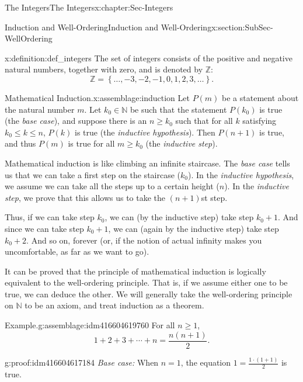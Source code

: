 \documentclass[oneside,10pt,]{book}
\numberwithin{equation}{section}
\renewcommand{\le}{\leqslant}
\renewcommand{\ge}{\geqslant}
\newcommand{\set}[1]{\left\{ {#1} \right\}}
\def\Z{{\mathbb Z}}
\def\N{{\mathbb N}}
\begin{document}
\begin{chapterptx}{The Integers}{}{The Integers}{}{}{x:chapter:Sec-Integers}
\begin{sectionptx}{Induction and Well-Ordering}{}{Induction and Well-Ordering}{}{}{x:section:SubSec-WellOrdering}
\begin{definition}{}{x:definition:def_integers}
 \index{\(\Z\)} The set of integers consists of the positive and negative natural numbers, together with zero, and is denoted by \(\Z\):%
\begin{equation*}
\Z = \set{\ldots, -3, -2, -1, 0, 1, 2, 3, \ldots}\text{.}
\end{equation*}
%
\end{definition}
\begin{assemblage}{Mathematical Induction.}{x:assemblage:induction}%
Let \(P(m)\) be a statement about the natural number \(m\)\footnotemark{}. Let \(k_0\in \N\) be such that the statement \(P(k_0)\) is true (the \emph{base case}), and suppose there is an \(n\ge k_0\) such that for all \(k\) satisfying \(k_0 \le k \le n\), \(P(k)\) is true (the \emph{inductive hypothesis}). Then \(P(n+1)\) is true, and thus \(P(m)\) is true for all \(m\ge k_0\) (the \emph{inductive step}).%
\end{assemblage}
%
Mathematical induction is like climbing an infinite staircase. The \emph{base case} tells us that we can take a first step on the staircase (\(k_0\)). In the \emph{inductive hypothesis}, we assume we can take all the steps up to a certain height (\(n\)). In the \emph{inductive step}, we prove that this allows us to take the \((n+1)\)st step.%
\par
Thus, if we can take step \(k_0\), we can (by the inductive step) take step \(k_0 + 1\). And since we can take step \(k_0 + 1\), we can (again by the inductive step) take step \(k_0 + 2\). And so on, forever (or, if the notion of actual infinity makes you uncomfortable, as far as we want to go).%
\par
It can be proved that the principle of mathematical induction is logically equivalent to the well-ordering principle. That is, if we assume either one to be true, we can deduce the other. We will generally take the well-ordering principle on \(\N\) to be an axiom, and treat induction as a theorem.%
\begin{assemblage}{Example.}{g:assemblage:idm416604619760}%
For all \(n \ge 1\),%
\begin{equation*}
1+ 2 + 3 + \cdots + n = \frac{n(n+1)}{2}\text{.}
\end{equation*}
%
\end{assemblage}
\begin{proofptx}{}{g:proof:idm416604617184}
\emph{Base case:} When \(n = 1\), the equation \(1 = \frac{1\cdot (1+1)}{2}\) is true.%

\end{proofptx}
\end{sectionptx}
\end{chapterptx}
\end{document}
